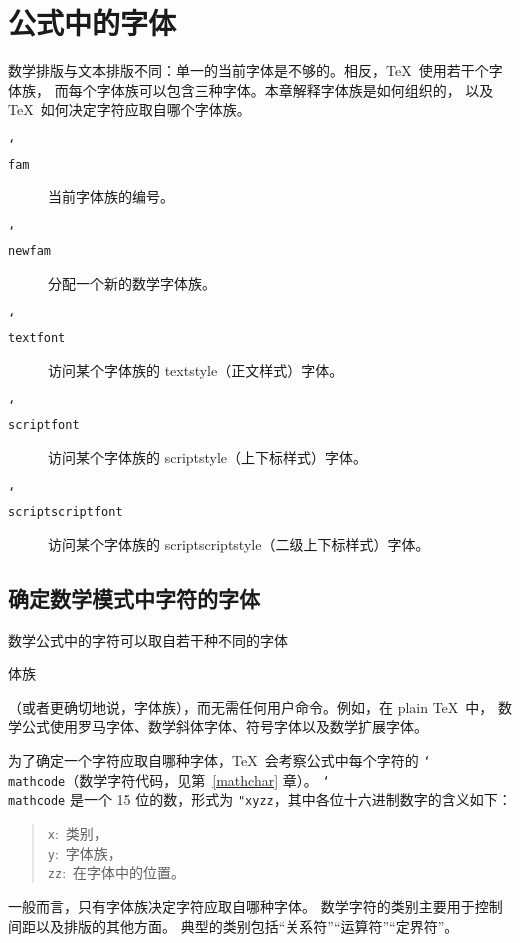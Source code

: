 \documentclass[a4paper]{rapport3}
\def\nl{\protect\\}\def\n#1{{\tt #1}}\def\cs#1{{\tt\char`\\#1}}\let\csc\cs
\def\alt{}\def\altt{}%
\newenvironment{disp}{\begin{quotation}}{\end{quotation}}
\newenvironment{inventory}{\begin{description}}{\end{description}}
\def\term#1\par{\index{#1}}
\begin{document}
\endofchapter
\chapter{公式中的字体}\label{mathfont}

数学排版与文本排版不同：单一的当前字体是不够的。相反，\TeX\ 使用若干个字体族，
而每个字体族可以包含三种字体。本章解释字体族是如何组织的，
以及 \TeX\ 如何决定字符应取自哪个字体族。


\begin{inventory}

\item [\cs{fam}]  
      当前字体族的编号。

\item [\cs{newfam}]  
      分配一个新的数学字体族。

\item [\cs{textfont}]   
      访问某个字体族的 textstyle（正文样式）字体。\alt

\item [\cs{scriptfont}]  
      访问某个字体族的 scriptstyle（上下标样式）字体。\alt

\item [\cs{scriptscriptfont}]  
      访问某个字体族的 scriptscriptstyle（二级上下标样式）字体。\alt

\end{inventory}

\section{确定数学模式中字符的字体}

数学公式中的字符可以取自若干种不同的字体
\term 字体族\par
（或者更确切地说，字体族），而无需任何用户命令。例如，在 plain \TeX\ 中，
数学公式使用罗马字体、数学斜体字体、符号字体以及数学扩展字体。

为了确定一个字符应取自哪种字体，\TeX\ 会考察公式中每个字符的
\cs{mathcode}（数学字符代码，见第~\ref{mathchar} 章）。
\cs{mathcode} 是一个 15 位的数，形式为
\verb."xyzz.，其中各位十六进制数字的含义如下：\begin{disp}
\n x:~类别，\nl
\n y:~字体族，\nl
\n{zz}:~在字体中的位置。\end{disp}

一般而言，只有字体族决定字符应取自哪种字体。
数学字符的类别主要用于控制间距以及排版的其他方面。
典型的类别包括“关系符”“运算符”“定界符”。
\end{document}
